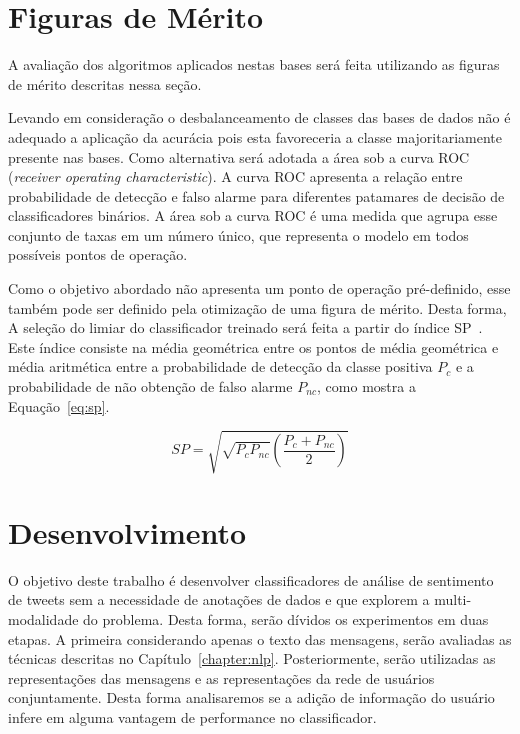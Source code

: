 \section{Figuras de Mérito}

A avaliação dos algoritmos aplicados nestas bases será feita utilizando as figuras
de mérito descritas nessa seção.

Levando em consideração o desbalanceamento de classes das bases de dados não é
adequado a aplicação da acurácia pois esta favoreceria a classe majoritariamente
presente nas bases.
Como alternativa será adotada a área sob a curva ROC (\textit{receiver operating
characteristic}).
A curva ROC apresenta a relação entre probabilidade de detecção e falso alarme
para diferentes patamares de decisão de classificadores binários.
A área sob a curva ROC é uma medida que agrupa esse conjunto de taxas em um
número único, que representa o modelo em todos possíveis pontos de operação.

Como o objetivo abordado não apresenta um ponto de operação pré-definido, esse
também pode ser definido pela otimização de uma figura de mérito.
Desta forma, A seleção do limiar do classificador treinado será feita a partir do
índice SP~\cite{ciodaro12}.
Este índice consiste na média geométrica entre os pontos de média geométrica e
média aritmética entre a probabilidade de detecção da classe positiva $P_c$ e a
probabilidade de não obtenção de falso alarme $P_{nc}$, como mostra a
Equação~\ref{eq:sp}.

\begin{equation} \label{eq:sp}
    SP = \sqrt{\sqrt{P_c P_{nc}} \left(\frac{P_c + P_{nc}}{2}\right)}
\end{equation}

\section{Desenvolvimento}
\label{sec:development}

O objetivo deste trabalho é desenvolver classificadores de análise de sentimento
de tweets sem a necessidade de anotações de dados e que explorem a multi-modalidade
do problema.
Desta forma, serão dívidos os experimentos em duas etapas.
A primeira considerando apenas o texto das mensagens, serão avaliadas as técnicas
descritas no Capítulo~\ref{chapter:nlp}.
Posteriormente, serão utilizadas as representações das mensagens e as
representações da rede de usuários conjuntamente.
Desta forma analisaremos se a adição de informação do usuário infere em alguma
vantagem de performance no classificador.

